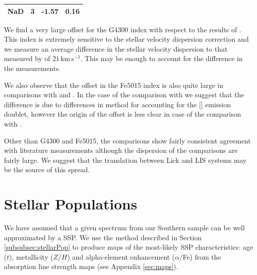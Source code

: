 \documentclass[a4paper,fleqn,usenatbib]{mnras}
\begin{document}
\begin{table}
\begin{tabular}{l r r r}
				NaD 		& 3 		& -1.57\leavevmode\phantom{0}& 0.16\leavevmode\phantom{0}	\\
				\hline
				\hline
			\end{tabular}
		\end{table}

		We find a very large offset for the G4300 index with respect to the results of \citet{Rampazzo2005}. This index is extremely sensitive to the stellar velocity dispersion correction and we measure an average difference in the stellar velocity dispersion to that measured by \citet{Rampazzo2005} of $21\,\mathrm{km\,s^{-1}}$. This may be enough to account for the difference in the measurements.

		We also observe that the offset in the Fe5015 index is also quite large in comparisons with \citet{Rampazzo2005} and \citet{Vazdekis2010}. In the case of the comparison with \citet{Rampazzo2005} we suggest that the difference is due to differences in method for accounting for the [] emission doublet, however the origin of the offset is less clear in case of the comparison with \citet{Vazdekis2010}. 

		Other than G4300 and Fe5015, the comparisons show fairly consistent agreement with literature measurements although the dispersion of the comparisons are fairly large. We suggest that the translation between Lick and LIS systems may be the source of this spread.

\section{Stellar Populations}
	\label{sec:stellarPop}
	We have assumed that a given spectrum from our Southern sample can be well approximated by a SSP. We use the method described in Section \ref{subsubsec:stellarPop} to produce maps of the most-likely SSP characteristics: age ($t$), metallicity ($Z/H$) and alpha-element enhancement ($\alpha$/Fe) from the absorption line strength maps (see Appendix \ref{sec:maps}).
\end{document}
